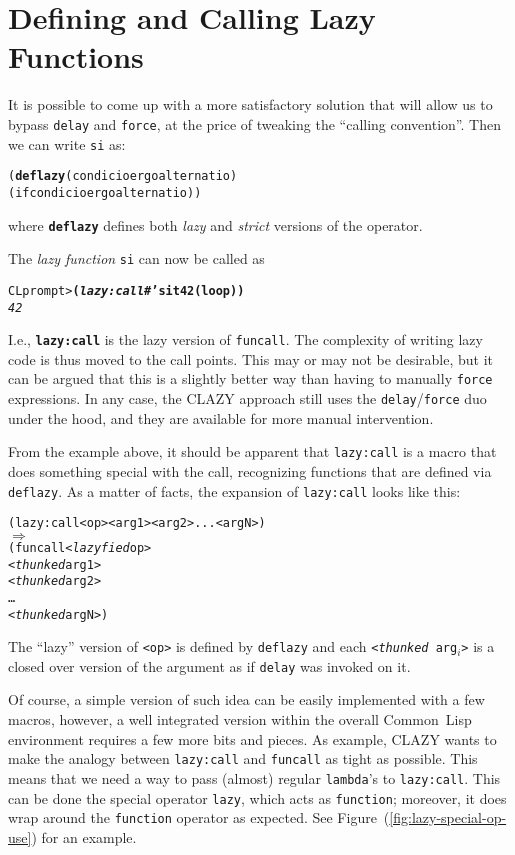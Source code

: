 \documentclass[fleqn,10pt]{article}
\newcommand{\CL}{\textsf{Common~Lisp}}
\newcommand{\CLAZY}{\textsf{CLAZY}}
\newcommand{\code}[1]{\texttt{#1}}
\begin{document}
\section{Defining and Calling Lazy Functions}

It is possible to come up with a more satisfactory solution that will
allow us to bypass \code{delay} and \code{force}, at the price of
tweaking the ``calling convention''.  Then we can write \code{si}
as:
\begin{alltt}

    (\textbf{deflazy} (condicio ergo alternatio)
       (if condicio ergo alternatio))

\end{alltt}
where \textbf{\code{deflazy}} defines both \emph{lazy} and
\emph{strict} versions of the operator.

\noindent
The \emph{lazy function} \code{si} can now be called as
\begin{alltt}

    CL prompt> \textbf{(\textit{lazy:call} #'si t 42 (loop))}
    \textit{42}

\end{alltt}
I.e., \textbf{\code{lazy:call}} is the lazy version of \code{funcall}.
The complexity of writing lazy code is thus moved to the call points.
This may or may not be desirable, but it can be argued that this is a
slightly better way than having to manually \code{force} expressions.
In any case, the \CLAZY{} approach still uses the
\code{delay}/\code{force} duo under the hood, and they are available
for more manual intervention.

From the example above, it should be apparent that \code{lazy:call} is
a macro that does something special with the call, recognizing
functions that are defined via \code{deflazy}.  As a matter of facts,
the expansion of \code{lazy:call} looks like this:
\begin{alltt}

   (lazy:call <op> <arg1> <arg2> ... <argN>)
   \(\Longrightarrow\)
   (funcall <\textit{lazyfied} op>
            <\textit{thunked} arg1>
            <\textit{thunked} arg2>
            \ldots
            <\textit{thunked} argN>)

\end{alltt}
The ``lazy'' version of \code{<op>} is defined by
\code{deflazy} and each \code{<\textit{thunked}~arg$_i$>} is a closed
over version of the argument as if \code{delay} was invoked on it.

Of course, a simple version of such idea can be easily implemented
with a few macros, however, a well integrated version within the
overall \CL{} environment requires a few more bits and pieces.  As
example, \CLAZY{} wants to make the analogy between \code{lazy:call}
and \code{funcall} as tight as possible.  This means that we need a
way to pass (almost) regular \code{lambda}'s to \code{lazy:call}.
This can be done the special operator \code{lazy}, which acts as
\code{function}; moreover, it does wrap around the \code{function}
operator as expected.  See Figure~(\ref{fig:lazy-special-op-use}) for an
example.
\end{document}
